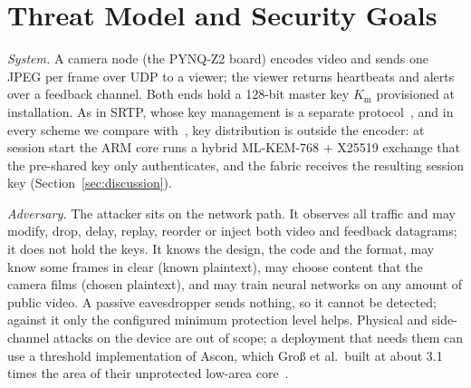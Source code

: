 \section{Threat Model and Security Goals}\label{sec:threat}
\textit{System.} A camera node (the PYNQ-Z2 board) encodes video and sends one JPEG per frame over UDP to a viewer; the viewer returns heartbeats and alerts over a feedback channel. Both ends hold a 128-bit master key $K_{\mathrm{m}}$ provisioned at installation. As in SRTP, whose key management is a separate protocol~\cite{rfc3711}, and in every scheme we compare with~\cite{vandroogenbroeck2002,kishore2015,auer2013,hirose2024,bagbaba2015}, key distribution is outside the encoder: at session start the ARM core runs a hybrid ML-KEM-768 + X25519 exchange that the pre-shared key only authenticates, and the fabric receives the resulting session key (Section~\ref{sec:discussion}).

\textit{Adversary.} The attacker sits on the network path. It observes all traffic and may modify, drop, delay, replay, reorder or inject both video and feedback datagrams; it does not hold the keys. It knows the design, the code and the format, may know some frames in clear (known plaintext), may choose content that the camera films (chosen plaintext), and may train neural networks on any amount of public video. A passive eavesdropper sends nothing, so it cannot be detected; against it only the configured minimum protection level helps. Physical and side-channel attacks on the device are out of scope; a deployment that needs them can use a threshold implementation of Ascon, which Gro{\ss} et al.\ built at about 3.1 times the area of their unprotected low-area core~\cite{gross2017}.


